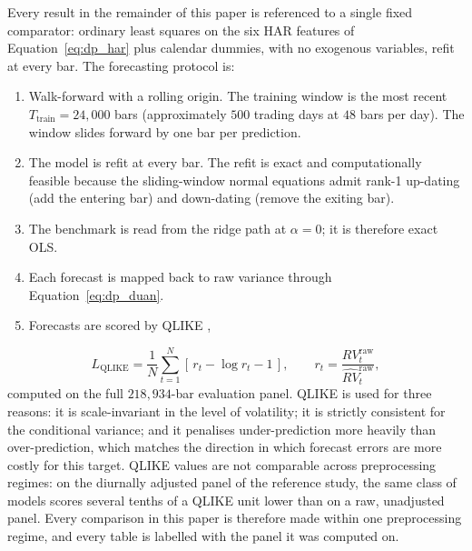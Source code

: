 Every result in the remainder of this paper is referenced to a single
fixed comparator: ordinary least squares on the six HAR features of
Equation~\eqref{eq:dp_har} plus calendar dummies, with no exogenous
variables, refit at every bar. The forecasting protocol is:
\begin{enumerate}
    \item Walk-forward with a rolling origin. The training window is the
      most recent $T_{\mathrm{train}} = 24{,}000$ bars (approximately
      $500$ trading days at $48$ bars per day). The window slides forward
      by one bar per prediction.
    \item The model is refit at every bar. The refit is exact and
      computationally feasible because the sliding-window normal
      equations admit rank-1 up-dating (add the entering bar) and
      down-dating (remove the exiting bar).
    \item The benchmark is read from the ridge path at $\alpha = 0$; it is
      therefore exact OLS.
    \item Each forecast is mapped back to raw variance through
      Equation~\eqref{eq:dp_duan}.
    \item Forecasts are scored by QLIKE \citep{Patton2011},
\end{enumerate}
\begin{equation}
    L_{\mathrm{QLIKE}}
    = \frac{1}{N}\sum_{t=1}^{N}\left[\, r_t - \log r_t - 1 \,\right],
    \qquad
    r_t = \frac{RV^{\mathrm{raw}}_t}{\widehat{RV}^{\mathrm{raw}}_t},
    \label{eq:dp_qlike}
\end{equation}
computed on the full $218{,}934$-bar evaluation panel. QLIKE is used for
three reasons: it is scale-invariant in the level of volatility; it is
strictly consistent for the conditional variance; and it penalises
under-prediction more heavily than over-prediction, which matches the
direction in which forecast errors are more costly for this target. QLIKE
values are not comparable across preprocessing regimes: on the diurnally
adjusted panel of the reference study, the same class of models scores
several tenths of a QLIKE unit lower than on a raw, unadjusted panel.
Every comparison in this paper is therefore made within one preprocessing
regime, and every table is labelled with the panel it was computed on.


